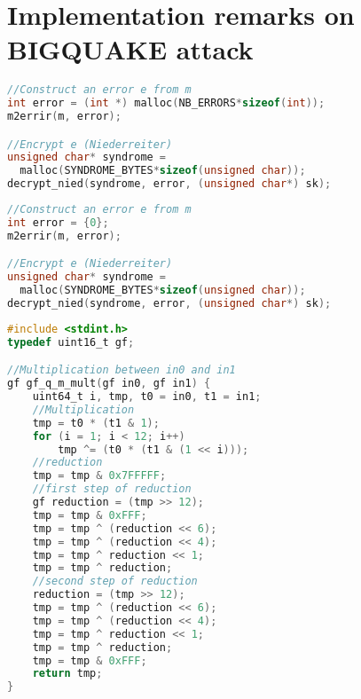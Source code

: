 \documentclass[brazil, english]{ufsc-thesis}
\begin{document}
\postextual


\appendix
\chapter{Implementation remarks on BIGQUAKE attack}\label{ch:imp-remarks}
\begin{lstlisting}[caption={Code snippet of BIGQUAKE error attribution },label={lst:error_original},language=C]
//Construct an error e from m
int error = (int *) malloc(NB_ERRORS*sizeof(int));
m2errir(m, error);

//Encrypt e (Niederreiter)
unsigned char* syndrome = 
  malloc(SYNDROME_BYTES*sizeof(unsigned char));
decrypt_nied(syndrome, error, (unsigned char*) sk);
\end{lstlisting}

\begin{lstlisting}[caption={Code snippet of BIGQUAKE error attribution with the fix. },label={lst:error_fix},language=C]
//Construct an error e from m
int error = {0};
m2errir(m, error);

//Encrypt e (Niederreiter)
unsigned char* syndrome = 
  malloc(SYNDROME_BYTES*sizeof(unsigned char));
decrypt_nied(syndrome, error, (unsigned char*) sk);
\end{lstlisting}

\begin{lstlisting}[caption={Multiplication of two elements in $\mathbb{F}_{2^{12}}$ and inversion of an element in $\mathbb{F}_{2^{12}}$},label={lst:mult},language=C]
#include <stdint.h>
typedef uint16_t gf;

//Multiplication between in0 and in1
gf gf_q_m_mult(gf in0, gf in1) {
    uint64_t i, tmp, t0 = in0, t1 = in1;
    //Multiplication
    tmp = t0 * (t1 & 1);
    for (i = 1; i < 12; i++)
        tmp ^= (t0 * (t1 & (1 << i)));
    //reduction
    tmp = tmp & 0x7FFFFF;
    //first step of reduction
    gf reduction = (tmp >> 12);
    tmp = tmp & 0xFFF;
    tmp = tmp ^ (reduction << 6);
    tmp = tmp ^ (reduction << 4);
    tmp = tmp ^ reduction << 1;
    tmp = tmp ^ reduction;
    //second step of reduction
    reduction = (tmp >> 12);
    tmp = tmp ^ (reduction << 6);
    tmp = tmp ^ (reduction << 4);
    tmp = tmp ^ reduction << 1;
    tmp = tmp ^ reduction;
    tmp = tmp & 0xFFF;
    return tmp;
}
\end{lstlisting}
\end{document}
